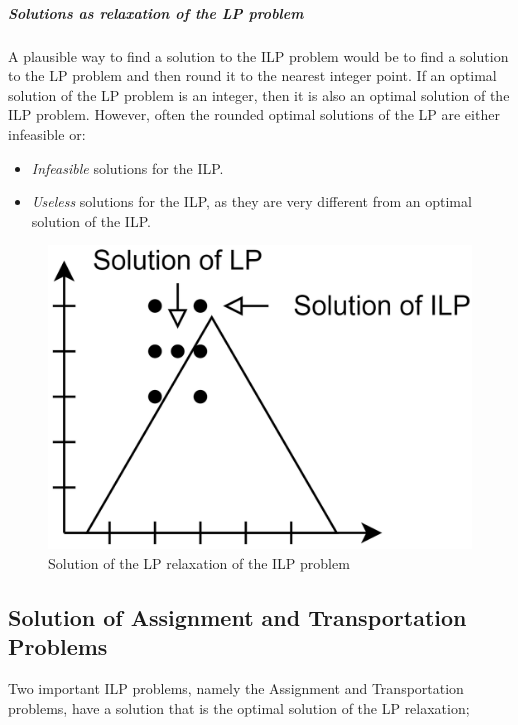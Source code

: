 \subparagraph*{Solutions as relaxation of the LP problem}
A plausible way to find a solution to the ILP problem would be to find a solution to the LP problem and then round it to the nearest integer point.
If an optimal solution of the LP problem is an integer, then it is also an optimal solution of the ILP problem.
However, often the rounded optimal solutions of the LP are either infeasible or:
\begin{itemize}
    \item \textit{Infeasible} solutions for the ILP.
    \item \textit{Useless} solutions for the ILP, as they are very different from an optimal solution of the ILP.
\end{itemize}
\begin{figure}[H]
    \centering
    \includegraphics[width=0.25\linewidth]{images/ilp2.png}
    \caption{Solution of the LP relaxation of the ILP problem}
\end{figure}

\subsection{Solution of Assignment and Transportation Problems}
Two important ILP problems, namely the Assignment and Transportation problems, have a solution that is the optimal solution of the LP relaxation;

